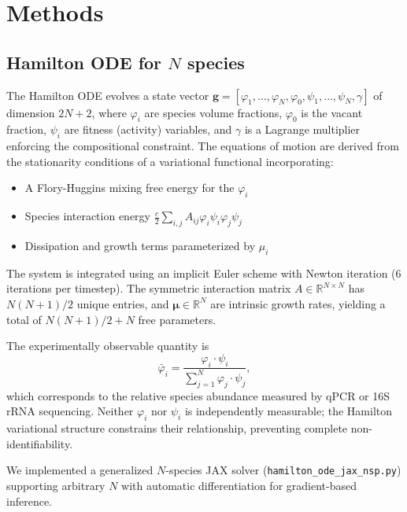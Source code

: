 \documentclass[10pt,a4paper]{article}
\begin{document}
\section{Methods}

\subsection{Hamilton ODE for $N$ species}

The Hamilton ODE evolves a state vector
$\mathbf{g} = [\varphi_1, \ldots, \varphi_N, \varphi_0,
\psi_1, \ldots, \psi_N, \gamma]$ of dimension $2N + 2$,
where $\varphi_i$ are species volume fractions, $\varphi_0$ is the
vacant fraction, $\psi_i$ are fitness (activity) variables, and
$\gamma$ is a Lagrange multiplier enforcing the compositional constraint.
The equations of motion are derived from the stationarity conditions of
a variational functional incorporating:
\begin{itemize}
\item A Flory-Huggins mixing free energy for the $\varphi_i$
\item Species interaction energy $\frac{c}{2} \sum_{i,j} A_{ij}
\varphi_i \psi_i \varphi_j \psi_j$
\item Dissipation and growth terms parameterized by $\mu_i$
\end{itemize}

The system is integrated using an implicit Euler scheme with Newton
iteration (6 iterations per timestep). The symmetric interaction matrix
$A \in \mathbb{R}^{N \times N}$ has $N(N+1)/2$ unique entries, and
$\boldsymbol{\mu} \in \mathbb{R}^N$ are intrinsic growth rates,
yielding a total of $N(N+1)/2 + N$ free parameters.

The experimentally observable quantity is
\begin{equation}
\bar{\varphi}_i = \frac{\varphi_i \cdot \psi_i}
{\sum_{j=1}^{N} \varphi_j \cdot \psi_j},
\label{eq:phibar}
\end{equation}
which corresponds to the relative species abundance measured by qPCR
or 16S rRNA sequencing. Neither $\varphi_i$ nor $\psi_i$ is independently
measurable; the Hamilton variational structure constrains their relationship,
preventing complete non-identifiability.

We implemented a generalized $N$-species JAX solver
(\texttt{hamilton\_ode\_jax\_nsp.py}) supporting arbitrary $N$ with
automatic differentiation for gradient-based inference.
\end{document}
